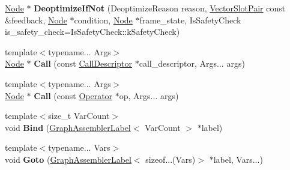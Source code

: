 \begin{DoxyCompactItemize}
\item 
\mbox{\label{classv8_1_1internal_1_1compiler_1_1GraphAssembler_a92346bdacd274390fddb85fa4c066ecd}} 
\mbox{\hyperlink{classv8_1_1internal_1_1compiler_1_1Node}{Node}} $\ast$ {\bfseries Deoptimize\+If\+Not} (Deoptimize\+Reason reason, \mbox{\hyperlink{classv8_1_1internal_1_1VectorSlotPair}{Vector\+Slot\+Pair}} const \&feedback, \mbox{\hyperlink{classv8_1_1internal_1_1compiler_1_1Node}{Node}} $\ast$condition, \mbox{\hyperlink{classv8_1_1internal_1_1compiler_1_1Node}{Node}} $\ast$frame\+\_\+state, Is\+Safety\+Check is\+\_\+safety\+\_\+check=Is\+Safety\+Check\+::k\+Safety\+Check)
\item 
\mbox{\label{classv8_1_1internal_1_1compiler_1_1GraphAssembler_ae98f5a57008564135c44c43c608e8c17}} 
{\footnotesize template$<$typename... Args$>$ }\\\mbox{\hyperlink{classv8_1_1internal_1_1compiler_1_1Node}{Node}} $\ast$ {\bfseries Call} (const \mbox{\hyperlink{classv8_1_1internal_1_1compiler_1_1CallDescriptor}{Call\+Descriptor}} $\ast$call\+\_\+descriptor, Args... args)
\item 
\mbox{\label{classv8_1_1internal_1_1compiler_1_1GraphAssembler_a7e2712023ec5e29e97daa318d5000083}} 
{\footnotesize template$<$typename... Args$>$ }\\\mbox{\hyperlink{classv8_1_1internal_1_1compiler_1_1Node}{Node}} $\ast$ {\bfseries Call} (const \mbox{\hyperlink{classv8_1_1internal_1_1compiler_1_1Operator}{Operator}} $\ast$op, Args... args)
\item 
\mbox{\label{classv8_1_1internal_1_1compiler_1_1GraphAssembler_ad72401aa552537aab912cfa266968952}} 
{\footnotesize template$<$size\+\_\+t Var\+Count$>$ }\\void {\bfseries Bind} (\mbox{\hyperlink{classv8_1_1internal_1_1compiler_1_1GraphAssemblerLabel}{Graph\+Assembler\+Label}}$<$ Var\+Count $>$ $\ast$label)
\item 
\mbox{\label{classv8_1_1internal_1_1compiler_1_1GraphAssembler_a59fa56fa30c643a8e20e857607cf5d89}} 
{\footnotesize template$<$typename... Vars$>$ }\\void {\bfseries Goto} (\mbox{\hyperlink{classv8_1_1internal_1_1compiler_1_1GraphAssemblerLabel}{Graph\+Assembler\+Label}}$<$ sizeof...(Vars)$>$ $\ast$label, Vars...)

\end{DoxyCompactItemize}

